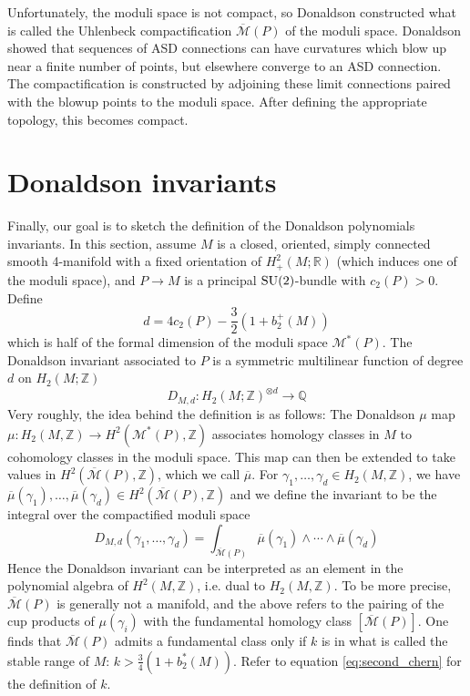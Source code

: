 Unfortunately, the moduli space is not compact, so Donaldson constructed what is
called the Uhlenbeck compactification $\overline{\mathcal{M}}(P)$ of the
moduli space. Donaldson showed that sequences of ASD connections can have
curvatures which blow up near a finite number of points, but elsewhere converge
to an ASD connection. The compactification is constructed by adjoining these
limit connections paired with the blowup points to the moduli space. After
defining the appropriate topology, this becomes compact.

\section{Donaldson invariants}
Finally, our goal is to sketch the definition of the Donaldson polynomials
invariants. 
In this section, assume $M$ is a closed,
oriented, simply connected smooth 4-manifold with a fixed orientation of
$H^2_+(M;\mathbb{R})$ (which induces one of the moduli space), and 
$P\to M$ is a principal $\operatorname{SU}(2)$-bundle with  $c_2(P) > 0$. Define 
\[
d = 4c_2(P) - \frac{3}{2}(1+b_2^+(M))
\] 
which is half of the formal dimension of the moduli space
$\mathcal{M}^*(P)$. The Donaldson invariant associated to $P$ is a
symmetric multilinear function of degree  $d$ on $H_2(M;\mathbb{Z})$ 
\[
D_{M,d} : H_2(M;\mathbb{Z})^{\otimes d} \to \mathbb{Q}
\] 
Very roughly, the idea behind the definition is as follows: The Donaldson $\mu$ 
map $\mu: H_2(M,\mathbb{Z}) \to H^2(\mathcal{M}^*(P),\mathbb{Z})$ associates
homology classes in $M$ to cohomology classes in the moduli space. 
This map can then be extended to take values in
$H^2(\overline{\mathcal{M}}(P),\mathbb{Z})$, which we call $\overline{\mu}$.
For $\gamma_1,\ldots,\gamma_d \in H_2(M,\mathbb{Z})$, we have 
$\overline{\mu}(\gamma_1),\ldots,\overline{\mu}(\gamma_d)\in 
H^2(\overline{\mathcal{M}}(P),\mathbb{Z})$ 
and we define the invariant to be the integral over the compactified moduli space
 \[
D_{M,d}(\gamma_1,\ldots,\gamma_d) 
= \int_{\overline{\mathcal{M}}(P)} \overline{\mu}(\gamma_1)\wedge \cdots\wedge
\overline{\mu}(\gamma_d)
\] 
Hence the Donaldson invariant can be interpreted as 
an element in the polynomial algebra of $H^2(M,\mathbb{Z})$, i.e. dual to
$H_2(M,\mathbb{Z})$.  
To be more precise, $\overline{\mathcal{M}}(P)$ is generally not a manifold, and the above
refers to the pairing of the cup products of $\mathcal{\mu}(\gamma_i)$ with the 
fundamental homology class $[\overline{\mathcal{M}}(P)]$. One finds that
$\overline{\mathcal{M}}(P)$ admits a fundamental class only if $k$ is in what is 
called the stable range of $M$:  $k > \frac{3}{4}(1+b_2^*(M))$. 
Refer to equation \ref{eq:second_chern} for the definition of $k$.

